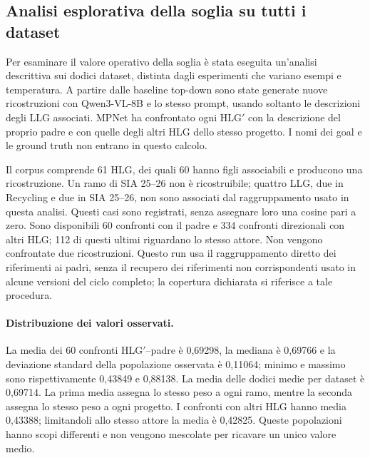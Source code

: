 \subsection{Analisi esplorativa della soglia su tutti i dataset}
\label{sec:cosine-tuning-all-datasets}
Per esaminare il valore operativo della soglia è stata eseguita un'analisi
descrittiva sui dodici dataset, distinta dagli esperimenti che variano esempi
e temperatura. A partire dalle baseline top-down sono state generate nuove
ricostruzioni con Qwen3-VL-8B e lo stesso prompt, usando soltanto le descrizioni
degli LLG associati. MPNet ha confrontato ogni HLG$'$ con la descrizione del
proprio padre e con quelle degli altri HLG dello stesso progetto. I nomi dei
goal e le ground truth non entrano in questo calcolo.

Il corpus comprende 61 HLG, dei quali 60 hanno figli associabili e producono
una ricostruzione. Un ramo di SIA 25--26 non è ricostruibile; quattro LLG,
due in Recycling e due in SIA 25--26, non sono associati dal raggruppamento
usato in questa analisi. Questi casi sono registrati, senza assegnare loro
una cosine pari a zero. Sono disponibili 60 confronti con il padre e 334
confronti direzionali con altri HLG; 112 di questi ultimi riguardano lo stesso
attore. Non vengono confrontate due ricostruzioni.
Questo run usa il raggruppamento diretto dei riferimenti ai padri, senza il
recupero dei riferimenti non corrispondenti usato in alcune versioni del ciclo
completo; la copertura dichiarata si riferisce a tale procedura.

\paragraph{Distribuzione dei valori osservati.}
La media dei 60 confronti HLG$'$--padre è 0,69298, la mediana è 0,69766
e la deviazione standard della popolazione osservata è 0,11064; minimo
e massimo sono rispettivamente 0,43849 e 0,88138. La media delle dodici
medie per dataset è 0,69714. La prima media assegna lo stesso peso a ogni
ramo, mentre la seconda assegna lo stesso peso a ogni progetto.
I confronti con altri HLG hanno media 0,43388; limitandoli allo stesso attore
la media è 0,42825. Queste popolazioni hanno scopi differenti e non vengono
mescolate per ricavare un unico valore medio.

